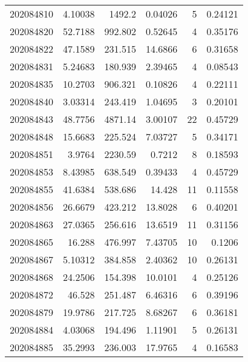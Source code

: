\begin{tabular}{rrrrrr}
 202084810 &          4.10038 &     1492.2    &            0.04026 &           5 & 0.24121 \\
 202084820 &         52.7188  &      992.802  &            0.52645 &           4 & 0.35176 \\
 202084822 &         47.1589  &      231.515  &           14.6866  &           6 & 0.31658 \\
 202084831 &          5.24683 &      180.939  &            2.39465 &           4 & 0.08543 \\
 202084835 &         10.2703  &      906.321  &            0.10826 &           4 & 0.22111 \\
 202084840 &          3.03314 &      243.419  &            1.04695 &           3 & 0.20101 \\
 202084843 &         48.7756  &     4871.14   &            3.00107 &          22 & 0.45729 \\
 202084848 &         15.6683  &      225.524  &            7.03727 &           5 & 0.34171 \\
 202084851 &          3.9764  &     2230.59   &            0.7212  &           8 & 0.18593 \\
 202084853 &          8.43985 &      638.549  &            0.39433 &           4 & 0.45729 \\
 202084855 &         41.6384  &      538.686  &           14.428   &          11 & 0.11558 \\
 202084856 &         26.6679  &      423.212  &           13.8028  &           6 & 0.40201 \\
 202084863 &         27.0365  &      256.616  &           13.6519  &          11 & 0.31156 \\
 202084865 &         16.288   &      476.997  &            7.43705 &          10 & 0.1206  \\
 202084867 &          5.10312 &      384.858  &            2.40362 &          10 & 0.26131 \\
 202084868 &         24.2506  &      154.398  &           10.0101  &           4 & 0.25126 \\
 202084872 &         46.528   &      251.487  &            6.46316 &           6 & 0.39196 \\
 202084879 &         19.9786  &      217.725  &            8.68267 &           6 & 0.36181 \\
 202084884 &          4.03068 &      194.496  &            1.11901 &           5 & 0.26131 \\
 202084885 &         35.2993  &      236.003  &           17.9765  &           4 & 0.16583 \\

\end{tabular}
